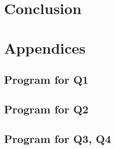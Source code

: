 \documentclass[12pt]{article}
\begin{document}
\section{Conclusion}
\newpage
\newpage
\listoffigures
\listoftables


\newpage
\section*{Appendices}
\subsection*{Program for Q1}


\subsection*{Program for Q2}



\subsection*{Program for Q3, Q4}

\end{document}
